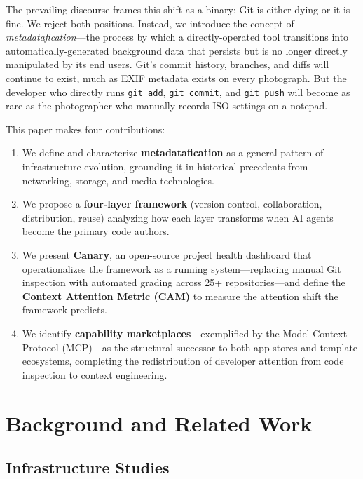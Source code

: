\documentclass[12pt]{article}
\begin{document}
The prevailing discourse frames this shift as a binary: Git is either dying or it is fine. We reject both positions. Instead, we introduce the concept of \textit{metadatafication}---the process by which a directly-operated tool transitions into automatically-generated background data that persists but is no longer directly manipulated by its end users. Git's commit history, branches, and diffs will continue to exist, much as EXIF metadata exists on every photograph. But the developer who directly runs \texttt{git add}, \texttt{git commit}, and \texttt{git push} will become as rare as the photographer who manually records ISO settings on a notepad.

This paper makes four contributions:
\begin{enumerate}
  \item %
We define and characterize \textbf{metadatafication} as a general pattern of infrastructure evolution, grounding it in historical precedents from networking, storage, and media technologies.
  \item We propose a \textbf{four-layer framework} (version control, collaboration, distribution, reuse) analyzing how each layer transforms when AI agents become the primary code authors.
  \item We present \textbf{Canary}, an open-source project health dashboard that operationalizes the framework as a running system---replacing manual Git inspection with automated grading across 25+ repositories---and define the \textbf{Context Attention Metric (CAM)} to measure the attention shift the framework predicts.
  \item We identify \textbf{capability marketplaces}---exemplified by the Model Context Protocol (MCP)---as the structural successor to both app stores and template ecosystems, completing the redistribution of developer attention from code inspection to context engineering.
\end{enumerate}

\section{Background and Related Work}

\subsection{Infrastructure Studies}
\end{document}

